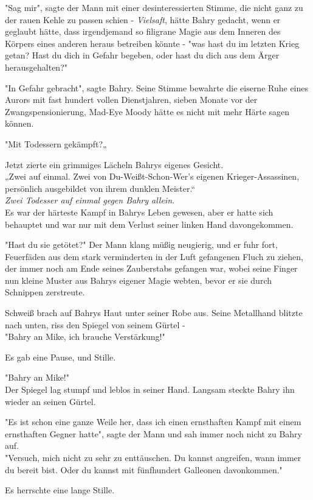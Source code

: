 {"Sag mir", sagte der Mann mit einer desinteressierten Stimme, die nicht ganz zu der rauen Kehle zu passen schien - \emph{Vielsaft}, hätte Bahry gedacht, wenn er geglaubt hätte, dass irgendjemand so filigrane Magie aus dem Inneren des Körpers eines anderen heraus betreiben könnte - "was hast du im letzten Krieg getan? Hast du dich in Gefahr begeben, oder hast du dich aus dem Ärger herausgehalten?"

"In Gefahr gebracht", sagte Bahry. Seine Stimme bewahrte die eiserne Ruhe eines Aurors mit fast hundert vollen Dienstjahren, sieben Monate vor der Zwangspensionierung, Mad-Eye Moody hätte es nicht mit mehr Härte sagen können.

"Mit Todessern gekämpft?„

Jetzt zierte ein grimmiges Lächeln Bahrys eigenes Gesicht.\\ „Zwei auf einmal. Zwei von Du-Weißt-Schon-Wer's eigenen Krieger-Assassinen, persönlich ausgebildet von ihrem dunklen Meister.“\\ \emph{Zwei Todesser auf einmal gegen Bahry allein.}\\ Es war der härteste Kampf in Bahrys Leben gewesen, aber er hatte sich behauptet und war nur mit dem Verlust seiner linken Hand davongekommen.

"Hast du sie getötet?" Der Mann klang müßig neugierig, und er fuhr fort, Feuerfäden aus dem stark verminderten in der Luft gefangenen Fluch zu ziehen, der immer noch am Ende seines Zauberstabs gefangen war, wobei seine Finger nun kleine Muster aus Bahrys eigener Magie webten, bevor er sie durch Schnippen zerstreute.

Schweiß brach auf Bahrys Haut unter seiner Robe aus. Seine Metallhand blitzte nach unten, riss den Spiegel von seinem Gürtel -\\ "Bahry an Mike, ich brauche Verstärkung!"

Es gab eine Pause, und Stille.

"Bahry an Mike!"\\ Der Spiegel lag stumpf und leblos in seiner Hand. Langsam steckte Bahry ihn wieder an seinen Gürtel.

"Es ist schon eine ganze Weile her, dass ich einen ernsthaften Kampf mit einem ernsthaften Gegner hatte", sagte der Mann und sah immer noch nicht zu Bahry auf.\\ "Versuch, mich nicht zu sehr zu enttäuschen. Du kannst angreifen, wann immer du bereit bist. Oder du kannst mit fünfhundert Galleonen davonkommen."

Es herrschte eine lange Stille.

}
